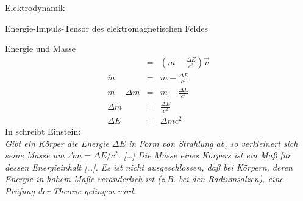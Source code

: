 \begin{chapter}{\titlestr}
\begin{section}{Elektrodynamik}
\begin{subsection}{Energie-Impuls-Tensor des elektromagnetischen Feldes}
\begin{subsubsection}{Energie und Masse}
\begin{eqnarray*}
&=&\left(m-\frac{\Delta E}{c^2}\right)\vec{v}\\
\tilde{m}&=&m-\frac{\Delta E}{c^2}\\
m-\Delta m&=&m-\frac{\Delta E}{c^2}\\
\Delta m&=&\frac{\Delta E}{c^2}\\
\Delta E &=& \Delta mc^2
\end{eqnarray*}
In  schreibt Einstein:\\\textit{Gibt ein Körper die Energie $\Delta E$ in Form von Strahlung ab, so verkleinert sich seine Masse um $\Delta m = \Delta E/c^2$. […] Die Masse eines Körpers ist ein Maß für dessen Energieinhalt […]. Es ist nicht ausgeschlossen, daß bei Körpern, deren Energie in hohem Maße veränderlich ist (z.B. bei den Radiumsalzen), eine Prüfung der Theorie gelingen wird.}
\end{subsubsection}
\end{subsection}


\end{section}
\end{chapter}
